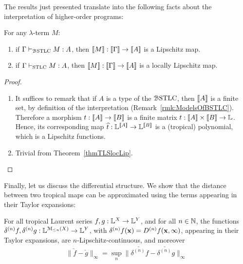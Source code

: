 The results just presented translate into the following facts about the interpretation of higher-order programs:
\begin{corollary}
For any $\lambda$-term $M$:
\begin{enumerate}
\item if $\Gamma \vdash_{\mathcal{B}\mathrm{STLC}} M:A$, then $\llbracket M\rrbracket:\llbracket\Gamma\rrbracket \to \llbracket A\rrbracket$ is a Lipschitz map.
\item if $\Gamma \vdash_{\mathrm{STLC}}M:A$, then $\llbracket M\rrbracket: \llbracket\Gamma\rrbracket \to \llbracket A\rrbracket$ is a locally Lipschitz map.
\end{enumerate}
\end{corollary} 
\begin{proof}
\begin{enumerate}
\item It suffices to remark that if $A$ is a type of the $\mathcal{B}\mathrm{STLC}$, then $\llbracket A\rrbracket$ is a finite set, by definition of the interpretation (Remark~\ref{rmk:ModelsOfBSTLC}).
Therefore a morphism $t:\llbracket A\rrbracket\to \llbracket B\rrbracket$ is a finite matrix $t: \llbracket A\rrbracket \times \llbracket B\rrbracket \to \mathbb{L}$.
Hence, its corresponding map $\widehat t:\mathbb{L}^{\llbracket A\rrbracket} \to \mathbb{L}^{\llbracket B\rrbracket}$ is a (tropical) polynomial, which is a Lipschitz functions.
\item Trivial from Theorem~\ref{thmTLSlocLip}.
\end{enumerate}
\end{proof}


Finally, let us discuss the differential structure. We show that the distance between two tropical maps can be approximated using the terms appearing in their Taylor expansions:
\begin{proposition}
For all tropical Laurent series $f,g: \mathbb{L}^{X}\to \mathbb{L}^{Y}$, and for all $n\in \mathbb{N}$, 
the functions
$\delta^{(n)}f, \delta^{(n)}g: \mathbb{L}^{\mathcal{M}_{\leq n}(X)}\to \mathbb{L} ^{Y}$, with 
 $\delta^{(n)}f(\B x)= \Der^{(n)}f(\B x, \infty)$, appearing in their Taylor expansions, are $n$-Lipschitz-continuous, and moreover 
\begin{align}
\| \check f-\check g\|_{\infty}= \sup_{n} \| \check{\delta^{(n)}f}- \check{\delta^{(n)}g}\|_{\infty}
\end{align}
\end{proposition} 




